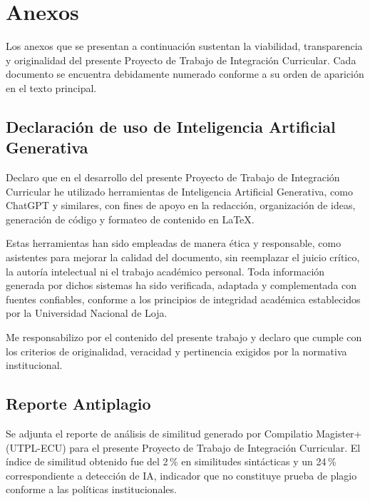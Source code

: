 \clearpage
\section{Anexos}

Los anexos que se presentan a continuación sustentan la viabilidad, transparencia y originalidad del presente Proyecto de Trabajo de Integración Curricular. Cada documento se encuentra debidamente numerado conforme a su orden de aparición en el texto principal.

\subsection{Declaración de uso de Inteligencia Artificial Generativa}

Declaro que en el desarrollo del presente Proyecto de Trabajo de Integración Curricular he utilizado herramientas de Inteligencia Artificial Generativa, como ChatGPT y similares, con fines de apoyo en la redacción, organización de ideas, generación de código y formateo de contenido en \LaTeX.

Estas herramientas han sido empleadas de manera ética y responsable, como asistentes para mejorar la calidad del documento, sin reemplazar el juicio crítico, la autoría intelectual ni el trabajo académico personal. Toda información generada por dichos sistemas ha sido verificada, adaptada y complementada con fuentes confiables, conforme a los principios de integridad académica establecidos por la Universidad Nacional de Loja.

Me responsabilizo por el contenido del presente trabajo y declaro que cumple con los criterios de originalidad, veracidad y pertinencia exigidos por la normativa institucional.

\clearpage
\subsection{Reporte Antiplagio}

Se adjunta el reporte de análisis de similitud generado por Compilatio Magister+ (UTPL-ECU) para el presente Proyecto de Trabajo de Integración Curricular. El índice de similitud obtenido fue del 2\,\% en similitudes sintácticas y un 24\,\% correspondiente a detección de IA, indicador que no constituye prueba de plagio conforme a las políticas institucionales.

